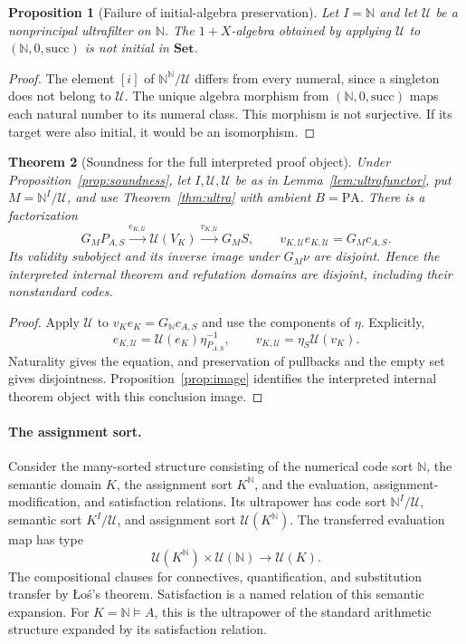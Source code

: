 \documentclass[11pt]{article}
\newtheorem{theorem}{Theorem}[section]
\newtheorem{proposition}[theorem]{Proposition}
\theoremstyle{definition}\newtheorem{definition}[theorem]{Definition}
\newcommand{\PA}{\mathrm{PA}}
\newcommand{\N}{\mathbb N}
\newcommand{\Set}{\mathbf{Set}}
\newcommand{\U}{\mathcal U}
\begin{document}
\begin{proposition}[Failure of initial-algebra preservation]\label{prop:ultra-initiality}
Let $I=\N$ and let $\U$ be a nonprincipal ultrafilter on $\N$.
The $1+X$-algebra obtained by applying $\mathscr U$ to
$(\N,0,\mathrm{succ})$ is not initial in $\Set$.
\end{proposition}
\begin{proof}
The element $[i]$ of $\N^{\N}/\U$ differs from every numeral,
since a singleton does not belong to $\U$. The unique algebra
morphism from $(\N,0,\mathrm{succ})$ maps each natural number
to its numeral class. This morphism is not surjective. If its target
were also initial, it would be an isomorphism.
\end{proof}

\begin{theorem}[Soundness for the full interpreted proof object]\label{thm:ultrasound}
Under Proposition~\ref{prop:soundness}, let $I,\U,\mathscr U$
be as in Lemma~\ref{lem:ultrafunctor}, put $M=\N^I/\U$,
and use Theorem~\ref{thm:ultra} with ambient $B=\PA$.
There is a factorization
\[
 G_MP_{A,S}\xrightarrow{e_{K,\U}}\mathscr U(V_K)
 \xrightarrow{v_{K,\U}}G_MS,
 \qquad v_{K,\U}e_{K,\U}=G_Mc_{A,S}.
\]
Its validity subobject and its inverse image under $G_M\nu$ are
disjoint. Hence the interpreted internal theorem and refutation
domains are disjoint, including their nonstandard codes.
\end{theorem}
\begin{proof}
Apply $\mathscr U$ to $v_Ke_K=G_{\N}c_{A,S}$ and use the
components of $\eta$. Explicitly,
\[
 e_{K,\U}=\mathscr U(e_K)\eta_{P_{A,S}}^{-1},\qquad
 v_{K,\U}=\eta_S\mathscr U(v_K).
\]
Naturality gives the equation, and preservation of pullbacks and
the empty set gives disjointness. Proposition~\ref{prop:image}
identifies the interpreted internal theorem object with this
conclusion image.
\end{proof}

\paragraph{The assignment sort.}
Consider the many-sorted structure consisting of the numerical
code sort $\N$, the semantic domain $K$, the assignment sort
$K^{\N}$, and the evaluation, assignment-modification, and satisfaction
relations. Its ultrapower has code sort $\N^I/\U$, semantic sort
$K^I/\U$, and assignment sort $\mathscr U(K^{\N})$. The transferred
evaluation map has type
\[
 \mathscr U(K^{\N})\times\mathscr U(\N)\longrightarrow\mathscr U(K).
\]
The compositional clauses for connectives, quantification, and
substitution transfer by \L{}o\'s's theorem. Satisfaction is a named
relation of this semantic expansion. For $K=\N\models A$, this
is the ultrapower of the standard arithmetic structure expanded
by its satisfaction relation.
\end{document}
